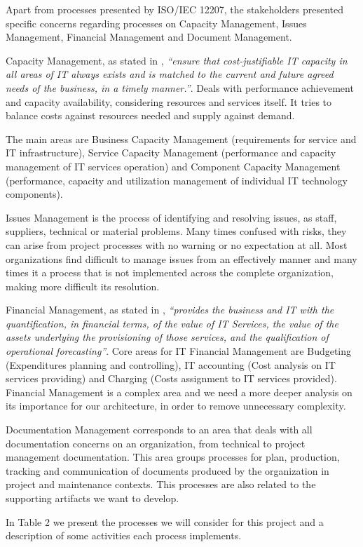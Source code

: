 Apart from processes presented by ISO/IEC 12207, the stakeholders presented specific concerns regarding processes on Capacity Management, Issues Management, Financial Management and Document Management.\par
Capacity Management, as stated in \cite{itilSD}, \textit{``ensure that cost-justifiable IT capacity in all areas of IT always exists and is matched to the current and future agreed needs of the business, in a timely manner.''}. Deals with performance achievement and capacity availability, considering resources and services itself. It tries to balance costs against resources needed and supply against demand.\par
The main areas are Business Capacity Management (requirements for service and IT infrastructure), Service Capacity Management (performance and capacity management of IT services operation) and Component Capacity Management (performance, capacity and utilization management of individual IT technology components).\par
Issues Management is the process of identifying and resolving issues, as staff, suppliers, technical or material problems. Many times confused with risks, they can arise from project processes with no warning or no expectation at all. Most organizations find difficult to manage issues from an effectively manner and many times it a process that is not implemented across the complete organization, making more difficult its resolution.\par
Financial Management, as stated in \cite{itilSS}, \textit{``provides the business and IT with the quantification, in financial terms, of the value of IT Services, the value of the assets underlying the provisioning of those services, and the qualification of operational forecasting''}. Core areas for IT Financial Management are Budgeting (Expenditures planning and controlling), IT accounting (Cost analysis on IT services providing) and Charging (Costs assignment to IT services provided). Financial Management is a complex area and we need a more deeper analysis on its importance for our architecture, in order to remove unnecessary complexity.\par
Documentation Management corresponds to an area that deals with all documentation concerns on an organization, from technical to project management documentation. This area groups processes for plan, production, tracking and communication of documents produced by the organization in project and maintenance contexts. This processes are also related to the supporting artifacts we want to develop.\par
In Table 2 we present the processes we will consider for this project and a description of some activities each process implements.

